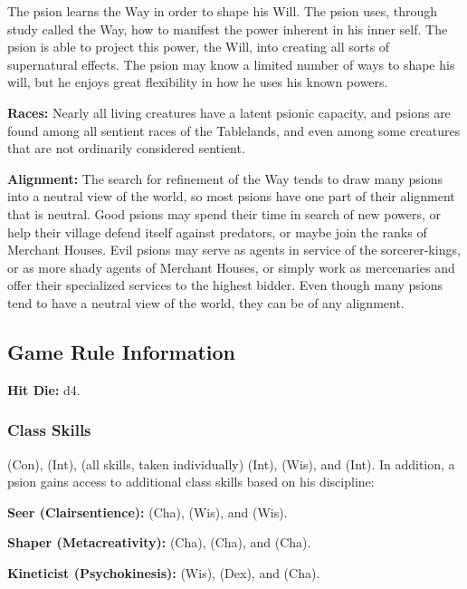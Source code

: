 The psion learns the Way in order to shape his Will. The psion uses, through study called the Way, how to manifest the power inherent in his inner self. The psion is able to project this power, the Will, into creating all sorts of supernatural effects. The psion may know a limited number of ways to shape his will, but he enjoys great flexibility in how he uses his known powers.

\textbf{Races:} Nearly all living creatures have a latent psionic capacity, and psions are found among all sentient races of the Tablelands, and even among some creatures that are not ordinarily considered sentient.

\textbf{Alignment:} The search for refinement of the Way tends to draw many psions into a neutral view of the world, so most psions have one part of their alignment that is neutral. Good psions may spend their time in search of new powers, or help their village defend itself against predators, or maybe join the ranks of Merchant Houses. Evil psions may serve as agents in service of the sorcerer-kings, or as more shady agents of Merchant Houses, or simply work as mercenaries and offer their specialized services to the highest bidder. Even though many psions tend to have a neutral view of the world, they can be of any alignment.

\subsection{Game Rule Information}

\textbf{Hit Die:} d4.

\subsubsection{Class Skills}

 (Con),  (Int),  (all skills, taken individually) (Int),  (Wis), and  (Int). In addition, a psion gains access to additional class skills based on his discipline:

\textbf{Seer (Clairsentience):}  (Cha),  (Wis), and  (Wis).

\textbf{Shaper (Metacreativity):}  (Cha),  (Cha), and  (Cha).

\textbf{Kineticist (Psychokinesis):}  (Wis),  (Dex), and  (Cha).

